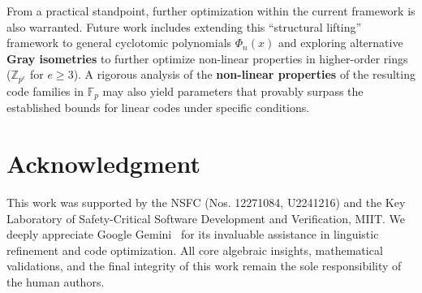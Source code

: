 \documentclass[12pt]{article}
\theoremstyle{plain}
\numberwithin{equation}{section}
\begin{document}
From a practical standpoint, further optimization within the current framework is also warranted. 
Future work includes extending this ``structural lifting'' framework to general cyclotomic polynomials $\Phi_n(x)$ and exploring alternative \textbf{Gray isometries} to further optimize non-linear properties in higher-order rings ($\mathbb{Z}_{p^e}$ for $e \ge 3$). 
A rigorous analysis of the \textbf{non-linear properties} of the resulting code families in $\mathbb{F}_p$ may also yield parameters that provably surpass the established bounds for linear codes under specific conditions.



\section*{Acknowledgment}
This work was supported by the NSFC (Nos. 12271084, U2241216) and the Key Laboratory of Safety-Critical Software Development and Verification, MIIT. 
We deeply appreciate Google Gemini~\cite{gemini2026} for its invaluable assistance in linguistic refinement and code optimization. All core algebraic insights, mathematical validations, and the final integrity of this work remain the sole responsibility of the human authors.



\end{document}
